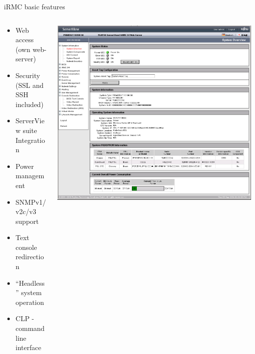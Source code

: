 \documentclass{beamer}
\begin{document}
  \begin{frame}{iRMC basic features}
	  \begin{columns}[onlytextwidth]
  		  \begin{column}{0.6\textwidth}
			  \begin{itemize}
				  \item Web access (own web-server)
				  \item Security (SSL and SSH included)
				  \item ServerView suite Integration
				  \item Power management
				  \item SNMPv1/v2c/v3 support
				  \item Text console redirection
				  \item “Headless” system operation
				  \item CLP - command line interface 
			  \end{itemize}
		  \end{column}

  		  \begin{column}{0.4\textwidth}
			  \includegraphics[width=\textwidth]{screenshot/webif.png}
		  \end{column}
	  \end{columns}

  \end{frame}
\end{document}
